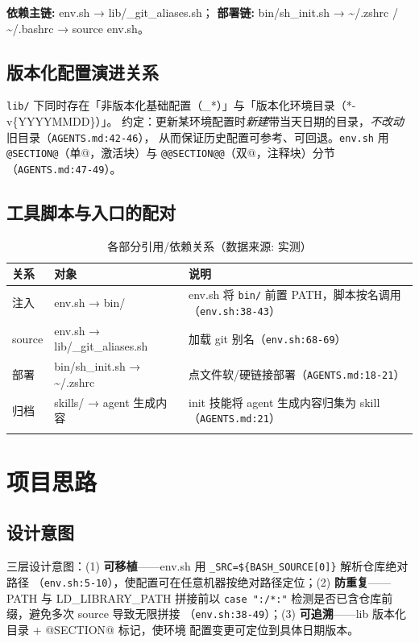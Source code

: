 \documentclass[UTF8]{ctexart}
\begin{document}
\begin{keybox}
\textbf{依赖主链:} \textcolor{relation}{env.sh → lib/\_git\_aliases.sh}；
\textbf{部署链:} \textcolor{relation}{bin/sh\_init.sh → \textasciitilde/.zshrc / \textasciitilde/.bashrc → source env.sh}。
\end{keybox}

\subsection{版本化配置演进关系}
\texttt{lib/} 下同时存在「非版本化基础配置（\_*）」与「版本化环境目录（*-v\{YYYYMMDD\}）」。
约定：更新某环境配置时\emph{新建}带当天日期的目录，\emph{不改动}旧目录（\texttt{\nolinkurl{AGENTS.md:42-46}}），
从而保证历史配置可参考、可回退。\texttt{env.sh} 用 \texttt{@SECTION@}（单@，激活块）与
\texttt{@@SECTION@@}（双@，注释块）分节（\texttt{\nolinkurl{AGENTS.md:47-49}}）。

\subsection{工具脚本与入口的配对}
\begin{xltabular}{\textwidth}{llX}
\toprule
\textcolor{relation}{关系} & 对象 & \textcolor{relation}{说明} \\
\midrule
\endhead
注入 & env.sh → bin/ & env.sh 将 \texttt{bin/} 前置 PATH，脚本按名调用（\texttt{\nolinkurl{env.sh:38-43}}） \\
source & env.sh → lib/\_git\_aliases.sh & 加载 git 别名（\texttt{\nolinkurl{env.sh:68-69}}） \\
部署 & bin/sh\_init.sh → \textasciitilde/.zshrc & 点文件软/硬链接部署（\texttt{\nolinkurl{AGENTS.md:18-21}}） \\
归档 & skills/ → agent 生成内容 & init 技能将 agent 生成内容归集为 skill（\texttt{\nolinkurl{AGENTS.md:21}}） \\
\bottomrule
\caption{各部分引用/依赖关系（数据来源: 实测）}
\end{xltabular}

\section{项目思路}
\subsection{设计意图}
三层设计意图：(1) \textbf{可移植}——env.sh 用 \texttt{\_SRC=\$\{BASH\_SOURCE[0]\}} 解析仓库绝对路径
（\texttt{\nolinkurl{env.sh:5-10}}），使配置可在任意机器按绝对路径定位；(2) \textbf{防重复}——PATH 与
LD\_LIBRARY\_PATH 拼接前以 \texttt{case ":/*:"} 检测是否已含仓库前缀，避免多次 source 导致无限拼接
（\texttt{\nolinkurl{env.sh:38-49}}）；(3) \textbf{可追溯}——lib 版本化目录 + @SECTION@ 标记，使环境
配置变更可定位到具体日期版本。
\end{document}
